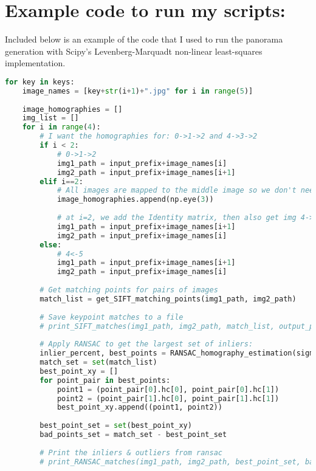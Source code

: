 \documentclass{article}
\begin{document}
\section{Example code to run my scripts:}
Included below is an example of the code that I used to run the panorama generation with Scipy's Levenberg-Marquadt non-linear least-squares implementation.
\begin{lstlisting}[language=Python]
for key in keys: 
    image_names = [key+str(i+1)+".jpg" for i in range(5)]
    
    image_homographies = []
    img_list = []
    for i in range(4):
        # I want the homographies for: 0->1->2 and 4->3->2
        if i < 2:
            # 0->1->2 
            img1_path = input_prefix+image_names[i]
            img2_path = input_prefix+image_names[i+1]
        elif i==2:
            # All images are mapped to the middle image so we don't need to compute the homography from 2->2
            image_homographies.append(np.eye(3))
            
            # at i=2, we add the Identity matrix, then also get img 4->3
            img1_path = input_prefix+image_names[i+1]
            img2_path = input_prefix+image_names[i]
        else:
            # 4<-5
            img1_path = input_prefix+image_names[i+1]
            img2_path = input_prefix+image_names[i]
            
        # Get matching points for pairs of images
        match_list = get_SIFT_matching_points(img1_path, img2_path)
        
        # Save keypoint matches to a file
        # print_SIFT_matches(img1_path, img2_path, match_list, output_prefix+"SIFT_Matches/"+key+str(i)+"_"+str(i+1)+".jpg") 
        
        # Apply RANSAC to get the largest set of inliers:
        inlier_percent, best_points = RANSAC_homography_estimation(sigma, match_list)
        match_set = set(match_list)
        best_point_xy = []
        for point_pair in best_points:
            point1 = (point_pair[0].hc[0], point_pair[0].hc[1])
            point2 = (point_pair[1].hc[0], point_pair[1].hc[1])
            best_point_xy.append((point1, point2))
            
        best_point_set = set(best_point_xy)
        bad_points_set = match_set - best_point_set
        
        # Print the inliers & outliers from ransac
        # print_RANSAC_matches(img1_path, img2_path, best_point_set, bad_points_set, output_prefix+"RANSAC/"+key+str(i)+"_"+str(i+1)+".jpg") 
        

\end{lstlisting}
\end{document}
